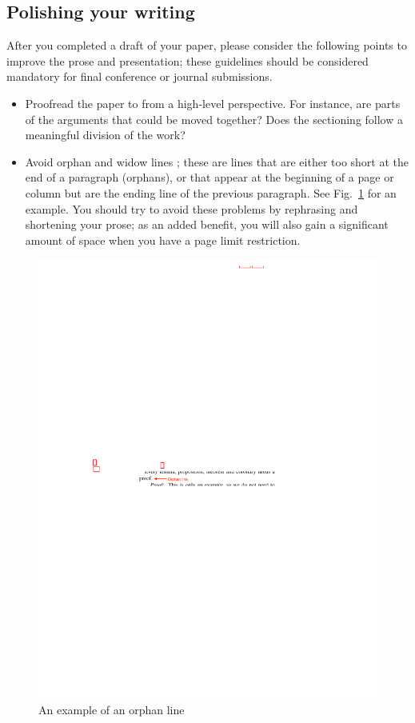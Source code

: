 \documentclass[letterpaper, 10 pt, conference]{ieeeconf}
\begin{document}
\subsection{Polishing your writing}
After you completed a draft of your paper, please consider the following points to improve the prose and presentation; these guidelines should be considered mandatory for final conference or journal submissions.
\begin{itemize}
\item Proofread the paper to from a high-level perspective. For instance, are parts of the arguments that could be moved together? Does the sectioning follow a meaningful division of the work?
\item Avoid orphan and widow lines \cite{WidowOrphanLines}; these are lines that are either too short at the end of a paragraph (orphans), or that appear at the beginning of a page or column but are the ending line of the previous paragraph. See Fig.~\ref{fig:orphan-line} for an example. You should try to avoid these problems by rephrasing and shortening your prose; as an added benefit, you will also gain a significant amount of space when you have a page limit restriction.

  
\end{itemize}
\begin{figure}
  \centering
  \includegraphics[width=0.9\linewidth]{figures/orphan-line}
  \caption{An example of an orphan line}
  \label{fig:orphan-line}
\end{figure}
\end{document}
